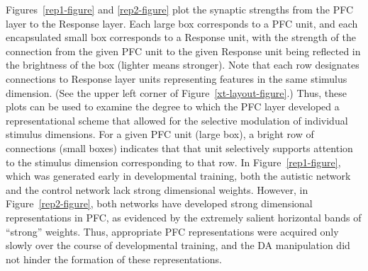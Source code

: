 \documentclass[man]{apa}
\begin{document}
Figures~\ref{rep1-figure} and \ref{rep2-figure} plot the synaptic
strengths from the PFC layer to the Response layer.  Each large box
corresponds to a PFC unit, and each encapsulated small box corresponds
to a Response unit, with the strength of the connection from the given
PFC unit to the given Response unit being reflected in the brightness
of the box (lighter means stronger).  Note that each row designates
connections to Response layer units representing features in the same
stimulus dimension.  (See the upper left corner of
Figure~\ref{xt-layout-figure}.)  Thus, these plots can be used to
examine the degree to which the PFC layer developed a representational scheme that allowed for the selective modulation of individual stimulus dimensions.  For a given PFC unit (large box), a bright row of connections (small boxes) indicates that that unit selectively supports attention to the stimulus dimension corresponding to that row.  In
Figure~\ref{rep1-figure}, which was generated early in developmental
training, both the autistic network and the control network lack
strong dimensional weights.  However, in Figure~\ref{rep2-figure},
both networks have developed strong dimensional representations in
PFC, as evidenced by the extremely salient horizontal bands of
``strong'' weights.  Thus, appropriate PFC representations were
acquired only slowly over the course of developmental training, and
the DA manipulation did not hinder the formation of these
representations.
\end{document}
